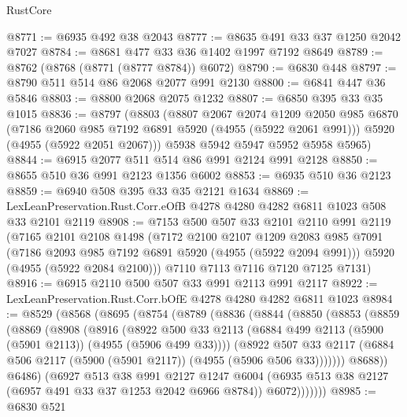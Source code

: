 \begin{lexlean}{RustCore}
\begin{coremodule}
@8771 := @6935 @492 @38 @2043
@8777 := @8635 @491 @33 @37 @1250 @2042 @7027
@8784 := @8681 @477 @33 @36 @1402 @1997 @7192 @8649
@8789 := @8762 (@8768 (@8771 (@8777 @8784)) @6072)
@8790 := @6830 @448
@8797 := @8790 @511 @514 @86 @2068 @2077 @991 @2130
@8800 := @6841 @447 @36 @5846
@8803 := @8800 @2068 @2075 @1232
@8807 := @6850 @395 @33 @35 @1015
@8836 := @8797
    (@8803
      (@8807
        @2067
        @2074
        @1209
        @2050
        @985
        @6870
        (@7186 @2060 @985 @7192 @6891 @5920 (@4955 (@5922 @2061 @991)))
        @5920
        (@4955 (@5922 @2051 @2067)))
      @5938
      @5942
      @5947
      @5952
      @5958
      @5965)
@8844 := @6915 @2077 @511 @514 @86 @991 @2124 @991 @2128
@8850 := @8655 @510 @36 @991 @2123 @1356 @6002
@8853 := @6935 @510 @36 @2123
@8859 := @6940 @508 @395 @33 @35 @2121 @1634
@8869 := LexLeanPreservation.Rust.Corr.eOfB @4278 @4280 @4282 @6811 @1023 @508 @33 @2101 @2119
@8908 := @7153
    @500
    @507
    @33
    @2101
    @2110
    @991
    @2119
    (@7165
      @2101
      @2108
      @1498
      (@7172
        @2100
        @2107
        @1209
        @2083
        @985
        @7091
        (@7186 @2093 @985 @7192 @6891 @5920 (@4955 (@5922 @2094 @991)))
        @5920
        (@4955 (@5922 @2084 @2100)))
      @7110
      @7113
      @7116
      @7120
      @7125
      @7131)
@8916 := @6915 @2110 @500 @507 @33 @991 @2113 @991 @2117
@8922 := LexLeanPreservation.Rust.Corr.bOfE @4278 @4280 @4282 @6811 @1023
@8984 := @8529
    (@8568
      (@8695
        (@8754
          (@8789
            (@8836
              (@8844
                (@8850
                  (@8853
                    (@8859
                      (@8869
                        (@8908
                          (@8916
                            (@8922
                              @500
                              @33
                              @2113
                              (@6884 @499 @2113 (@5900 (@5901 @2113)) (@4955 (@5906 @499 @33))))
                            (@8922
                              @507
                              @33
                              @2117
                              (@6884 @506 @2117 (@5900 (@5901 @2117)) (@4955 (@5906 @506 @33)))))))
                      @8688))
                  @6486)
                (@6927
                  @513
                  @38
                  @991
                  @2127
                  @1247
                  @6004
                  (@6935 @513 @38 @2127 (@6957 @491 @33 @37 @1253 @2042 @6966 @8784))
                  @6072)))))))
@8985 := @6830 @521

\end{coremodule}
\end{lexlean}

